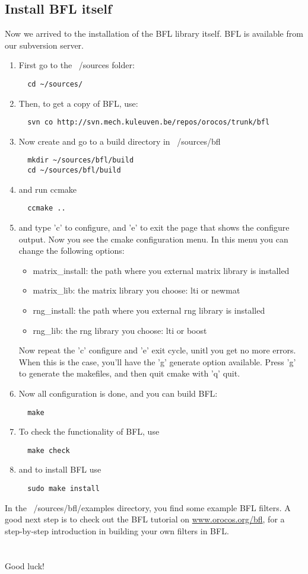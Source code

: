 \documentclass[a4paper,10pt]{article}
\begin{document}
\subsection{Install BFL itself}
Now we arrived to the installation of the BFL library itself. BFL is
available from our subversion server.
\begin{enumerate}
\item First go to the ~/sources folder:
\begin{verbatim}
  cd ~/sources/
\end{verbatim}
\item Then, to get a copy of BFL, use:
\begin{verbatim}
  svn co http://svn.mech.kuleuven.be/repos/orocos/trunk/bfl
\end{verbatim}
\item Now create and go to a build directory in ~/sources/bfl
\begin{verbatim}
  mkdir ~/sources/bfl/build
  cd ~/sources/bfl/build
\end{verbatim}
\item and run ccmake
\begin{verbatim}
  ccmake ..
\end{verbatim}
\item and type 'c' to configure, and 'e' to exit the page that shows
  the configure output. Now you see the cmake configuration menu. In
  this menu you can change the following options:
\begin{itemize}
\item matrix\_install: the path where you external matrix library is
  installed
\item matrix\_lib: the matrix library you choose: lti or newmat
\item rng\_install: the path where you external rng library is
  installed
\item rng\_lib: the rng library you choose: lti or boost
\end{itemize}
Now repeat the 'c' configure and 'e' exit cycle, unitl you get no more
errors. When this is the case, you'll have the 'g' generate option
available. Press 'g' to generate the makefiles, and then quit cmake
with 'q' quit.
\item Now all configuration is done, and you can build BFL:
\begin{verbatim}
  make 
\end{verbatim}	
\item To check the functionality of BFL, use
\begin{verbatim}
  make check
\end{verbatim}	
\item and to install BFL use
\begin{verbatim}
  sudo make install
\end{verbatim}
\end{enumerate}
In the ~/sources/bfl/examples directory, you find some example BFL
filters. A good next step is to check out the BFL tutorial on
\url{www.orocos.org/bfl}, for a step-by-step introduction in building
your own filters in BFL.
\\\\\\
Good luck!
\end{document}
